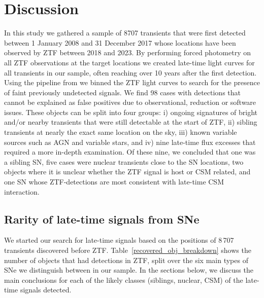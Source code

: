 \documentclass[a4paper,oneside,12pt, class=Latex/Classes/PhDthesisPSnPDF, crop=false]{standalone}
\begin{document}
\section{Discussion}
\label{discussion}
In this study we gathered a sample of 8707 transients that were first detected between 1 January 2008 and 31 December 2017 whose locations have been observed by ZTF between 2018 and 2023. By performing forced photometry on all ZTF observations at the target locations we created late-time light curves for all transients in our sample, often reaching over 10 years after the first detection. Using the pipeline from \citet{Terwel_2024_paper1} we binned the ZTF light curves to search for the presence of faint previously undetected signals. We find 98 cases with detections that cannot be explained as false positives due to observational, reduction or software issues. These objects can be split into four groups: i) ongoing signatures of bright and/or nearby transients that were still detectable at the start of ZTF, ii) sibling transients at nearly the exact same location on the sky, iii) known variable sources such as AGN and variable stars, and iv) nine late-time flux excesses that required a more in-depth examination. Of these nine, we concluded that one was a sibling SN, five cases were nuclear transients close to the SN locations, two objects where it is unclear whether the ZTF signal is host or CSM related, and one SN whose ZTF-detections are most consistent with late-time CSM interaction.


\subsection{Rarity of late-time signals from SNe}
We started our search for late-time signals based on the positions of 8\,707 transients discovered before ZTF. Table~\ref{recovered_obj_breakdown} shows the number of objects that had detections in ZTF, split over the six main types of SNe we distinguish between in our sample. In the sections below, we discuss the main conclusions for each of the likely classes (siblings, nuclear, CSM) of the late-time signals detected.
\end{document}
